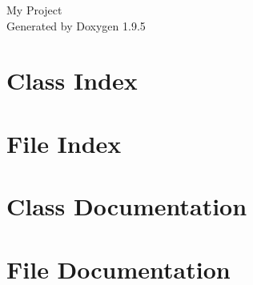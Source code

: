 \documentclass[twoside]{book}
\newcommand{\+}{\discretionary{\mbox{\scriptsize$\hookleftarrow$}}{}{}}
\newcommand{\clearemptydoublepage}{%
    \newpage{\pagestyle{empty}\cleardoublepage}%
  }
\begin{document}
  \raggedbottom
    \hypersetup{pageanchor=false,
                bookmarksnumbered=true,
                pdfencoding=unicode
               }
  \begin{titlepage}
  \vspace*{7cm}
  \begin{center}%
  {\Large My Project}\\
  \vspace*{1cm}
  {\large Generated by Doxygen 1.9.5}\\
  \end{center}
  \end{titlepage}
  \clearemptydoublepage
  \tableofcontents
  \clearemptydoublepage
  \hypersetup{pageanchor=true}
\chapter{Class Index}

\chapter{File Index}

\chapter{Class Documentation}

\chapter{File Documentation}




































  \backmatter
  \newpage
  \clearemptydoublepage
  \printindex
\end{document}
